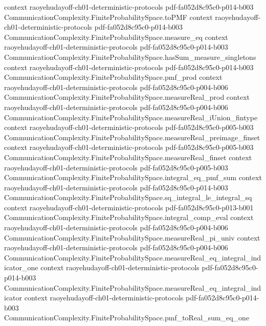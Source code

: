 \begin{theorem}
  {context}
  {raoyehudayoff-ch01-deterministic-protocols}
  {pdf-fa052d8c95c0-p014-b003}
\proofstep
  {CommunicationComplexity.FiniteProbabilitySpace.toPMF}
  {context}
  {raoyehudayoff-ch01-deterministic-protocols}
  {pdf-fa052d8c95c0-p014-b003}
\proofstep
  {CommunicationComplexity.FiniteProbabilitySpace.measure_eq}
  {context}
  {raoyehudayoff-ch01-deterministic-protocols}
  {pdf-fa052d8c95c0-p014-b003}
\proofstep
  {CommunicationComplexity.FiniteProbabilitySpace.hasSum_measure_singletons}
  {context}
  {raoyehudayoff-ch01-deterministic-protocols}
  {pdf-fa052d8c95c0-p014-b003}
\proofstep
  {CommunicationComplexity.FiniteProbabilitySpace.pmf_prod}
  {context}
  {raoyehudayoff-ch01-deterministic-protocols}
  {pdf-fa052d8c95c0-p004-b006}
\proofstep
  {CommunicationComplexity.FiniteProbabilitySpace.measureReal_prod}
  {context}
  {raoyehudayoff-ch01-deterministic-protocols}
  {pdf-fa052d8c95c0-p004-b006}
\proofstep
  {CommunicationComplexity.FiniteProbabilitySpace.measureReal_iUnion_fintype}
  {context}
  {raoyehudayoff-ch01-deterministic-protocols}
  {pdf-fa052d8c95c0-p005-b003}
\proofstep
  {CommunicationComplexity.FiniteProbabilitySpace.measureReal_preimage_finset}
  {context}
  {raoyehudayoff-ch01-deterministic-protocols}
  {pdf-fa052d8c95c0-p005-b003}
\proofstep
  {CommunicationComplexity.FiniteProbabilitySpace.measureReal_finset}
  {context}
  {raoyehudayoff-ch01-deterministic-protocols}
  {pdf-fa052d8c95c0-p005-b003}
\proofstep
  {CommunicationComplexity.FiniteProbabilitySpace.integral_eq_pmf_sum}
  {context}
  {raoyehudayoff-ch01-deterministic-protocols}
  {pdf-fa052d8c95c0-p014-b003}
\proofstep
  {CommunicationComplexity.FiniteProbabilitySpace.sq_integral_le_integral_sq}
  {context}
  {raoyehudayoff-ch01-deterministic-protocols}
  {pdf-fa052d8c95c0-p013-b001}
\proofstep
  {CommunicationComplexity.FiniteProbabilitySpace.integral_comp_eval}
  {context}
  {raoyehudayoff-ch01-deterministic-protocols}
  {pdf-fa052d8c95c0-p004-b006}
\proofstep
  {CommunicationComplexity.FiniteProbabilitySpace.measureReal_pi_univ}
  {context}
  {raoyehudayoff-ch01-deterministic-protocols}
  {pdf-fa052d8c95c0-p004-b006}
\proofstep
  {CommunicationComplexity.FiniteProbabilitySpace.measureReal_eq_integral_indicator_one}
  {context}
  {raoyehudayoff-ch01-deterministic-protocols}
  {pdf-fa052d8c95c0-p014-b003}
\proofstep
  {CommunicationComplexity.FiniteProbabilitySpace.measureReal_eq_integral_indicator}
  {context}
  {raoyehudayoff-ch01-deterministic-protocols}
  {pdf-fa052d8c95c0-p014-b003}
\proofstep
  {CommunicationComplexity.FiniteProbabilitySpace.pmf_toReal_sum_eq_one}

\end{theorem}
